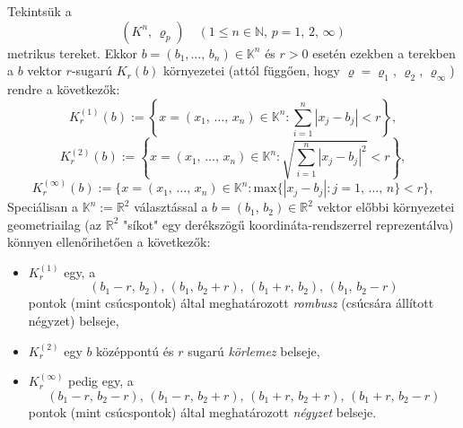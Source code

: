 \documentclass[12pt]{article}
\newcommand{\R}{\mathbb{R}}
\newcommand{\N}{\mathbb{N}}
\newcommand{\K}{\mathbb{K}}
\begin{document}
    Tekintsük a
    \[
        (K^n, \, \varrho_p) \quad (1 \leq n \in \N, \, p = 1, \, 2, \, \infty)
    \]
    metrikus tereket. Ekkor $b = (b_1, \dots, \, b_n) \in \K^n$ és $r > 0$ esetén ezekben a terekben a $b$ vektor $r$-sugarú $K_r(b)$ környezetei (attól függően, hogy $\varrho = \varrho_1, \, \varrho_2, \, \varrho_\infty$) rendre a következők:
    \[
        K_r^{(1)}(b) := \left\{ x = (x_1, \, \dots, \, x_n) \in \K^n : \sum_{i=1}^n |x_j - b_j| < r \right\},
    \]
    \[
        K_r^{(2)}(b) := \left\{ x = (x_1, \, \dots, \, x_n) \in \K^n : \sqrt{\sum_{i=1}^n |x_j - b_j|^2} < r \right\},
    \]
    \[
        K_r^{(\infty)}(b) := \Bigg\{ x = (x_1, \, \dots, \, x_n) \in \K^n : \text{max}\{|x_j - b_j| : j = 1, \, \dots, \, n\} < r \Bigg\},
    \]
    Speciálisan a $\K^n := \R^2$ választással a $b = (b_1, \, b_2) \in \R^2$ vektor előbbi környezetei geometriailag (az $\R^2$ "síkot" egy derékszögű koordináta-rendszerrel reprezentálva) könnyen ellenőrihetően a következők:
    \begin{itemize}
        \item $K_r^{(1)}$ egy, a
        \[
            (b_1 - r, \, b_2), \, (b_1, \, b_2 + r), \, (b_1 + r, \, b_2), \, (b_1, \, b_2 - r)
        \]
        pontok (mint csúcspontok) által meghatározott \textit{rombusz} (csúcsára állított négyzet) belseje,
        \item $K_r^{(2)}$ egy $b$ középpontú és $r$ sugarú \textit{körlemez} belseje,
        \item $K_r^{(\infty)}$ pedig egy, a
        \[
            (b_1 - r, \, b_2 - r), \, (b_1 - r, \, b_2 + r), \, (b_1 + r, \, b_2 + r), \, (b_1 + r, \, b_2 - r)
        \]
        pontok (mint csúcspontok) által meghatározott \textit{négyzet} belseje.
    \end{itemize}
    
\end{document}

